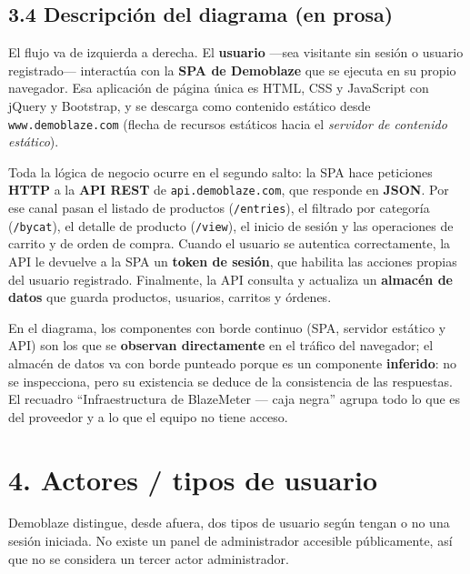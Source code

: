 \subsection*{3.4 Descripción del diagrama (en prosa)}

El flujo va de izquierda a derecha. El \textbf{usuario} —sea visitante sin sesión o
usuario registrado— interactúa con la \textbf{SPA de Demoblaze} que se ejecuta en su
propio navegador. Esa aplicación de página única es HTML, CSS y JavaScript con jQuery y
Bootstrap, y se descarga como contenido estático desde \texttt{www.demoblaze.com}
(flecha de recursos estáticos hacia el \emph{servidor de contenido estático}).

Toda la lógica de negocio ocurre en el segundo salto: la SPA hace peticiones
\textbf{HTTP} a la \textbf{API REST} de \texttt{api.demoblaze.com}, que responde en
\textbf{JSON}. Por ese canal pasan el listado de productos (\texttt{/entries}), el
filtrado por categoría (\texttt{/bycat}), el detalle de producto (\texttt{/view}), el
inicio de sesión y las operaciones de carrito y de orden de compra. Cuando el usuario
se autentica correctamente, la API le devuelve a la SPA un \textbf{token de sesión},
que habilita las acciones propias del usuario registrado. Finalmente, la API consulta y
actualiza un \textbf{almacén de datos} que guarda productos, usuarios, carritos y
órdenes.

En el diagrama, los componentes con borde continuo (SPA, servidor estático y API) son
los que se \textbf{observan directamente} en el tráfico del navegador; el almacén de
datos va con borde punteado porque es un componente \textbf{inferido}: no se
inspecciona, pero su existencia se deduce de la consistencia de las respuestas. El
recuadro ``Infraestructura de BlazeMeter — caja negra'' agrupa todo lo que es del
proveedor y a lo que el equipo no tiene acceso.

\FloatBarrier
\section*{4. Actores / tipos de usuario}

Demoblaze distingue, desde afuera, dos tipos de usuario según tengan o no una sesión
iniciada. No existe un panel de administrador accesible públicamente, así que no se
considera un tercer actor administrador.

